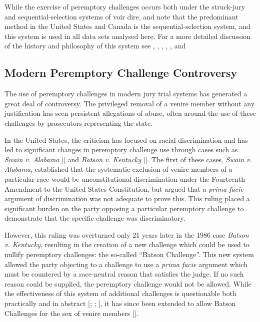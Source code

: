 While the exercise of peremptory challenges occurs both under the struck-jury and sequential-selection systems of voir dire, \cite{ford2010} and \cite{vandykejurysel} note that the predominant method in the United States and Canada is the sequential-selection system, and this system is used in all data sets analysed here. For a more detailed discussion of the history and philosophy of this system see \cite{vonmosch1921}, \cite{hoffman1997},  \cite{woolley2018}, \cite{rvsherratt}, \cite{hansvidjudging}, and \cite{vandykejurysel}

\subsection{Modern Peremptory Challenge Controversy} \label{sec:modper}

The use of peremptory challenges in modern jury trial systems has generated a great deal of controversy. The privileged
removal of a venire member without any justification
has seen persistent allegations of abuse, often around the use of these challenges by prosecutors representing the state.

In the United States, the criticism has focused on racial
discrimination and has led to significant changes in peremptory challenge use
through cases such as \textit{Swain v. Alabama} [\cite{swainvalabama}] and \textit{Batson v. Kentucky}
[\cite{batsonvkentucky}]. The first of these cases, \textit{Swain v. Alabama}, established that the systematic exclusion
of venire members of a particular race would be unconstitutional discrimination under the Fourteenth Amendment to the United
States Constitution, but argued that a \textit{prima facie} argument
of discrimination was not adequate to prove this. This ruling placed a significant burden on the party opposing a
particular peremptory challenge to demonstrate that the specific challenge was discriminatory.

However, this ruling was overturned only 21 years later in the 1986 case \textit{Batson v. Kentucky}, resulting in the creation of a new challenge which
could be used to nullify peremptory challenges: the so-called ``Batson Challenge''. This new system allowed the
party objecting to a challenge to use a \textit{prima facie} argument which must be countered by a race-neutral reason that
satisfies the judge. If no such reason could be supplied, the peremptory challenge would not be allowed. While the
effectiveness of this system of additional challenges is questionable both practically and in abstract [\cite{page2005};
\cite{morehead1994}; \cite{hoffman1997}], it has since been extended to allow Batson
Challenges for the sex of venire members [\cite{jebvalabama}].

